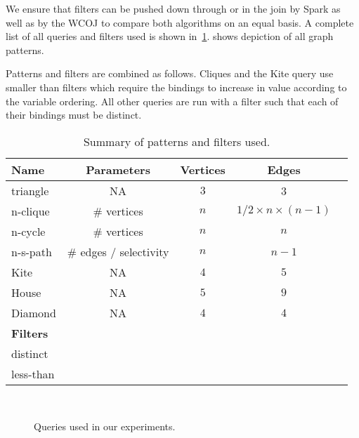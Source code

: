 We ensure that filters can be pushed down through or in the join by Spark as well as by the WCOJ to compare both algorithms on an equal basis.
A complete list of all queries and filters used is shown in~\cref{table:patterns}.
 shows depiction of all graph patterns.

Patterns and filters are combined as follows.
Cliques and the Kite query use smaller than filters which require the bindings to increase
in value according to the variable ordering.
All other queries are run with a filter such that each of their bindings must be distinct.

\begin{table}[]
    \centering
    \begin{tabular}{@{}lcccp{6cm}@{}}
        \toprule
        Name     & Parameters                 & Vertices & Edges

        \\ \midrule
        triangle & NA                         & $3$        & 3                 \\
        n-clique & \# vertices                & $n$        & $1/2 \times n \times (n - 1)$ \\
        n-cycle  & \# vertices                & $n$        & $n$                 \\
        n-s-path & \# edges / selectivity     & $n$        & $n - 1$                 \\
        Kite     & NA                         & $4$        & $5$                    \\
        House    & NA                         & $5$        & $9$                 \\
        Diamond  & NA                         & $4$        & $4$                 \\
        \textbf{Filters}   &                            &          &                   \\
        distinct  &                            &          &                   \\
        less-than &                            &          &                   \\ \bottomrule
    \end{tabular}
    \caption{Summary of patterns and filters used.}
    \label{table:patterns}
\end{table}

\begin{figure}
    \centering
    \subfloat[triangle]{}
    \subfloat[4-clique]{}
    \subfloat[5-clique]{}
    \subfloat[4-cycle]{}\\
    \subfloat[5-cycle]{}
    \subfloat[Diamond]{}
    \subfloat[Kite]{}
    \caption{Queries used in our experiments.}
    \label{fig:all-queries}
\end{figure}

